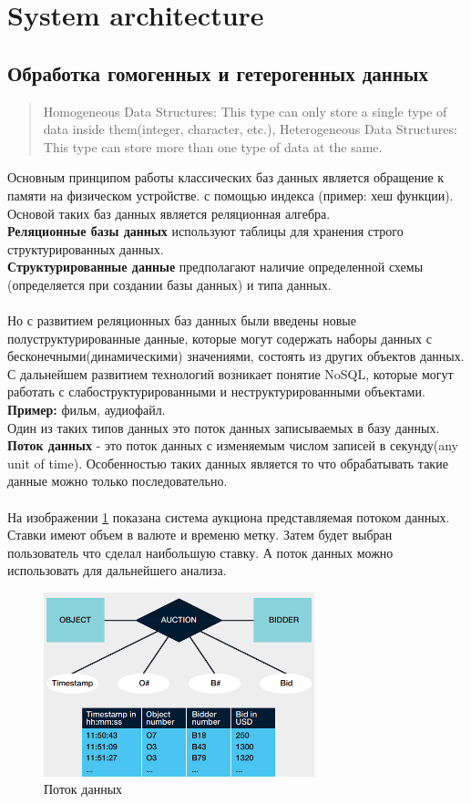 \documentclass{article}
\begin{document}

\tableofcontents
\newpage

\section{System architecture}


\subsection{Обработка гомогенных и гетерогенных данных}
\begin{quote}
    Homogeneous Data Structures: This type can only store a single type of data inside them(integer, character, etc.), Heterogeneous Data Structures: This type can store more than one type of data at the same.
\end{quote}
Основным принципом работы классических баз данных является обращение к памяти на физическом устройстве.
с помощью индекса (пример: хеш функции). Основой таких баз данных является реляционная алгебра.\\
\textbf{Реляционные базы данных} используют таблицы для хранения строго структурированных данных.\\
\textbf{Структурированные данные} предполагают наличие определенной схемы (определяется при создании базы данных) и типа данных.\\\\
Но с развитием реляционных баз данных были введены новые полуструктурированные данные, которые могут содержать наборы данных с бесконечными(динамическими) значениями, состоять из других объектов данных. С дальнейшем
развитием технологий возникает понятие NoSQL, которые могут работать с слабоструктурированными и неструктурированными объектами. \textbf{Пример: } фильм, аудиофайл.\\
Один из таких типов данных это поток данных записываемых в базу данных.\\
\textbf{Поток данных} - это поток данных с изменяемым числом записей в секунду(any unit of time). Особенностью таких данных является то что обрабатывать такие данные можно только последовательно.\\\\
На изображении \ref{img1} показана система аукциона представляемая потоком данных. Ставки имеют объем в валюте и временю метку. Затем будет выбран пользователь что сделал наибольшую ставку. А поток данных можно использовать для дальнейшего анализа.
\newpage
\begin{figure}[ht]
    \centering
    \includegraphics[width=0.7\textwidth]{images/datastream.png}
    \caption{Поток данных}
    \label{img1}
\end{figure}
\end{document}
